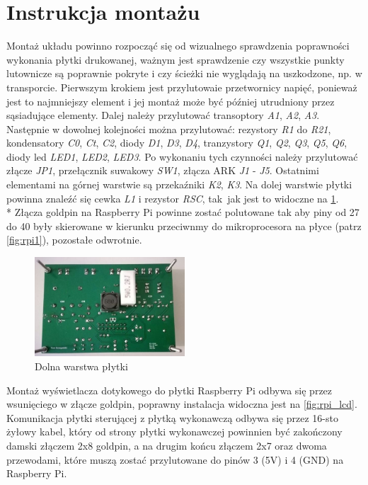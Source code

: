 \documentclass[12pt, eng, twoside, openany, final]{mgr}
\begin{document}
    \section{Instrukcja montażu}
    Montaż układu powinno rozpocząć się od wizualnego sprawdzenia poprawności wykonania płytki drukowanej, ważnym jest sprawdzenie czy wszystkie punkty lutownicze są poprawnie pokryte i czy ścieżki nie wyglądają na uszkodzone, np. w transporcie.
    Pierwszym krokiem jest przylutowaie przetwornicy napięć, ponieważ jest to najmniejszy element i jej montaż może być później utrudniony przez sąsiadujące elementy. Dalej należy przylutować transoptory \emph{A1}, \emph{A2}, \emph{A3}.  Następnie w dowolnej kolejności można przylutować: rezystory \emph{R1} do \emph{R21}, kondensatory \emph{C0}, \emph{Ct}, \emph{C2}, diody \emph{D1}, \emph{D3}, \emph{D4}, tranzystory \emph{Q1}, \emph{Q2}, \emph{Q3}, \emph{Q5}, \emph{Q6}, diody led \emph{LED1}, \emph{LED2}, \emph{LED3}. Po wykonaniu tych czynności należy przylutować złącze \emph{JP1}, przełącznik suwakowy \emph{SW1}, złącza ARK \emph{J1} - \emph{J5}. Ostatnimi elementami na górnej warstwie są przekaźniki \emph{K2}, \emph{K3}. Na dolej warstwie płytki powinna znaleźć się cewka \emph{L1} i rezystor \emph{RSC}, tak~jak jest to widoczne na \ref{fig:pcb_dol}. \\*
    Złącza goldpin na Raspberry Pi powinne zostać polutowane tak aby piny od 27 do 40 były skierowane w kierunku przeciwnmy do mikroprocesora na płyce (patrz \ref{fig:rpi1}), pozostałe odwrotnie. 
            \begin{figure}[H]
            \begin{center}
                \includegraphics[width=0.5\textwidth]{dol.jpg}
                \caption{Dolna warstwa płytki} \label{fig:pcb_dol} 
            \end{center}
            \end{figure}
    Montaż wyświetlacza dotykowego do płytki Raspberry Pi odbywa się przez wsunięciego w złącze goldpin, poprawny instalacja widoczna jest na \ref{fig:rpi_lcd}. Komunikacja płytki sterującej z płytką wykonawczą odbywa się przez 16-sto żyłowy kabel, który od strony płytki wykonawczej powinnien być zakończony damski złączem 2x8 goldpin, a na drugim końcu złączem 2x7 oraz dwoma przewodami, które muszą zostać przylutowane do pinów 3 (5V) i 4 (GND) na Raspberry Pi. 
\end{document}
